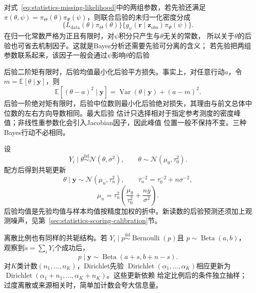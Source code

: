 对式~\eqref{eq:statistics-missing-likelihood}中的两组参数，若先验还满足
\(\pi(\theta,\psi)=\pi_\Theta(\theta)\pi_\Psi(\psi)\)，则联合后验的未归一化密度分成
\[
 \{L_{\mathrm{data}}(\theta)\pi_\Theta(\theta)\}
 \{g_\psi(\bm r\mid\bm z_{\mathrm{obs}})\pi_\Psi(\psi)\}.
\]
在归一化常数严格为正且有限时，对\(\psi\)积分只产生与\(\theta\)无关的常数，
所以关于\(\theta\)的后验也可省去机制因子。这就是Bayes分析还需要先验可分离的含义；
若先验把两组参数联系起来，该因子一般会通过\(\psi\)影响\(\theta\)的后验

后验二阶矩有限时，后验均值最小化后验平方损失。事实上，对任意行动\(a\)，令
\(m=\mathbb{E}[\theta\mid\bm y]\)，则
\[
  \mathbb{E}[(\theta-a)^2\mid\bm y]
  =\operatorname{Var}(\theta\mid\bm y)+(a-m)^2.
\]
后验一阶绝对矩有限时，后验中位数则最小化后验绝对损失，其理由与前文总体中位数的左右方向导数相同。最大后验
估计只选择相对于指定参考测度的密度峰值；非线性重参数化会引入Jacobian因子，因此峰值
位置一般不保持不变。三种Bayes行动不必相同。

设
\[
  Y_i\mid\theta\overset{\mathrm{iid}}{\sim}\mathcal N(\theta,\sigma^2),
  \qquad
  \theta\sim\mathcal N(\mu_0,\tau_0^2).
\]
配方后得到共轭更新
\[
  \theta\mid\bm y
  \sim\mathcal N(\mu_n,\tau_n^2),\qquad
  \tau_n^{-2}=\tau_0^{-2}+n\sigma^{-2},
\]
\[
  \mu_n=\tau_n^2
  \left(\frac{\mu_0}{\tau_0^2}+\frac{n\overline y}{\sigma^2}\right).
\]
后验均值是先验均值与样本均值按精度加权的折中。新读数的后验预测还须加上观测噪声，见第~\ref{sec:statistics-scoring-calibration}节。

离散比例也有同样的共轭结构。若
\(Y_i\mid p\overset{\mathrm{iid}}{\sim}\operatorname{Bernoulli}(p)\)且
\(p\sim\operatorname{Beta}(a,b)\)，观察到\(s=\sum_iY_i\)个成功后，
\[
  p\mid\bm y\sim\operatorname{Beta}(a+s,b+n-s).
\]
对\(K\)类计数\((n_1,\ldots,n_K)\)，Dirichlet先验
\(\operatorname{Dirichlet}(\alpha_1,\ldots,\alpha_K)\)相应更新为
\(\operatorname{Dirichlet}(\alpha_1+n_1,\ldots,\alpha_K+n_K)\)。这些更新依赖
给定比例后的条件独立抽样；过度离散或来源相关时，简单加计数会夸大信息量。

